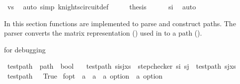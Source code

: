 \begin{isabellebody}
\ vs\ \isamarkupfalse%
\ {\isacharparenleft}{\kern0pt}auto\ simp{\isacharcolon}{\kern0pt}\ knights{\isacharunderscore}{\kern0pt}circuit{\isacharunderscore}{\kern0pt}def{\isacharparenright}{\kern0pt}\isanewline
\ \ \isamarkupfalse%
\ \isamarkupfalse%
\ {\isacharquery}{\kern0pt}thesis\isanewline
\ \ \ \ \isamarkupfalse%
\ si\ \isamarkupfalse%
\ auto\isanewline
{}\isamarkupfalse%
%
\endisatagproof
{\isafoldproof}%
%
\isadelimproof
%
\endisadelimproof
%
\isadelimdocument
%
\endisadelimdocument
%
\isatagdocument
%
\isamarkuptrue%
%
\endisatagdocument
{\isafolddocument}%
%
\isadelimdocument
%
\endisadelimdocument
%
\begin{isamarkuptext}%
In this section functions are implemented to parse and construct paths. The parser converts 
the matrix representation () used in \cite{cull_decurtins_1987} to a path 
().%
\end{isamarkuptext}\isamarkuptrue%
%
\begin{isamarkuptext}%
for debugging%
\end{isamarkuptext}\isamarkuptrue%
\isamarkupfalse%
\ test{\isacharunderscore}{\kern0pt}path\ {\isacharcolon}{\kern0pt}{\isacharcolon}{\kern0pt}\ {\isachardoublequoteopen}path\ {\isasymRightarrow}\ bool{\isachardoublequoteclose}\ \isanewline
\ \ {\isachardoublequoteopen}test{\isacharunderscore}{\kern0pt}path\ {\isacharparenleft}{\kern0pt}s\isactrlsub i{\isacharhash}{\kern0pt}s\isactrlsub j{\isacharhash}{\kern0pt}xs{\isacharparenright}{\kern0pt}\ {\isacharequal}{\kern0pt}\ {\isacharparenleft}{\kern0pt}step{\isacharunderscore}{\kern0pt}checker\ s\isactrlsub i\ s\isactrlsub j\ {\isasymand}\ test{\isacharunderscore}{\kern0pt}path\ {\isacharparenleft}{\kern0pt}s\isactrlsub j{\isacharhash}{\kern0pt}xs{\isacharparenright}{\kern0pt}{\isacharparenright}{\kern0pt}{\isachardoublequoteclose}\isanewline
{\isacharbar}{\kern0pt}\ {\isachardoublequoteopen}test{\isacharunderscore}{\kern0pt}path\ {\isacharunderscore}{\kern0pt}\ {\isacharequal}{\kern0pt}\ True{\isachardoublequoteclose}\isanewline
\isanewline
{}\isamarkupfalse%
\ f{\isacharunderscore}{\kern0pt}opt\ {\isacharcolon}{\kern0pt}{\isacharcolon}{\kern0pt}\ {\isachardoublequoteopen}{\isacharparenleft}{\kern0pt}{\isacharprime}{\kern0pt}a\ {\isasymRightarrow}\ {\isacharprime}{\kern0pt}a{\isacharparenright}{\kern0pt}\ {\isasymRightarrow}\ {\isacharprime}{\kern0pt}a\ option\ {\isasymRightarrow}\ {\isacharprime}{\kern0pt}a\ option{\isachardoublequoteclose}\ \isanewline

\end{isabellebody}
